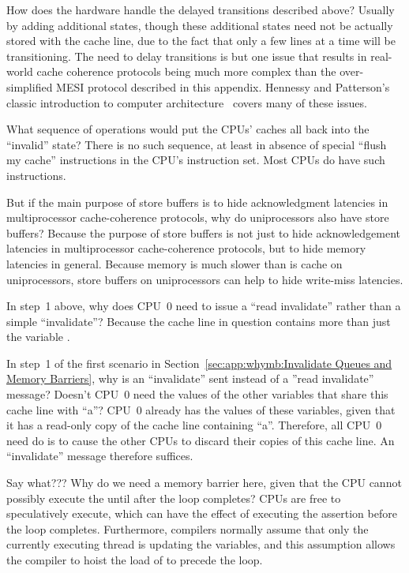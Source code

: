 \QuickQ{}
	How does the hardware handle the delayed transitions
	described above?
\QuickA{}
	Usually by adding additional states, though these additional
	states need not be actually stored with the cache line, due to
	the fact that only a few lines at a time will be transitioning.
	The need to delay transitions is but one issue that results in
	real-world cache coherence protocols being much more complex than
	the over-simplified MESI protocol described in this appendix.
	Hennessy and Patterson's classic introduction to computer
	architecture~\cite{Hennessy95a} covers many of these issues.

\QuickQ{}
	What sequence of operations would put the CPUs' caches
	all back into the ``invalid'' state?
\QuickA{}
	There is no such sequence, at least in absence of special
	``flush my cache'' instructions in the CPU's instruction set.
	Most CPUs do have such instructions.

\QuickQ{}
	But if the main purpose of store buffers is to hide acknowledgment
	latencies in multiprocessor cache-coherence protocols, why
	do uniprocessors also have store buffers?
\QuickA{}
	Because the purpose of store buffers is not just to hide
	acknowledgement latencies in multiprocessor cache-coherence protocols,
	but to hide memory latencies in general.
	Because memory is much slower than is cache on uniprocessors,
	store buffers on uniprocessors can help to hide write-miss
	latencies.

\QuickQ{}
	In step~1 above, why does CPU~0 need to issue a ``read invalidate''
	rather than a simple ``invalidate''?
\QuickA{}
	Because the cache line in question contains more than just the
	variable .

\QuickQ{}
	In step~1 of the first scenario in
	Section~\ref{sec:app:whymb:Invalidate Queues and Memory Barriers},
	why is an ``invalidate'' sent instead of a ''read invalidate''
	message?
	Doesn't CPU~0 need the values of the other variables that share
	this cache line with ``a''?
\QuickA{}
	CPU~0 already has the values of these variables, given that it
	has a read-only copy of the cache line containing ``a''.
	Therefore, all CPU~0 need do is to cause the other CPUs to discard
	their copies of this cache line.
	An ``invalidate'' message therefore suffices.

\QuickQ{}
	Say what???
	Why do we need a memory barrier here, given that the CPU cannot
	possibly execute the  until after the
	 loop completes?
\QuickA{}
	CPUs are free to speculatively execute, which can have the effect
	of executing the assertion before the  loop completes.
	Furthermore, compilers normally assume that only the currently
	executing thread is updating the variables, and this assumption
	allows the compiler to hoist the load of  to precede the
	loop.

